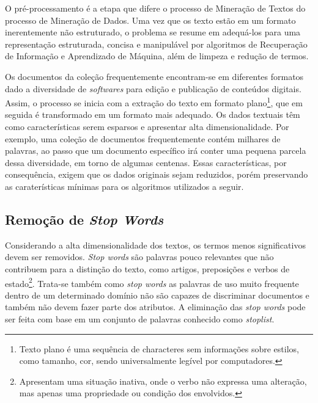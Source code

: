 


O pré-processamento é a etapa que difere o processo de Mineração de Textos do processo de Mineração de Dados. Uma vez que os texto estão em um formato inerentemente não estruturado, o problema se resume em adequá-los para uma representação estruturada, concisa e manipulável por algoritmos de Recuperação de Informação e Aprendizado de Máquina, além de limpeza e redução de termos.



Os documentos da coleção frequentemente encontram-se em diferentes formatos dado a diversidade de \textit{softwares} para edição e publicação de conteúdos digitais. Assim, o processo se inicia com a extração do texto em formato plano\footnote{Texto plano é uma sequência de characteres sem informações sobre estilos, como tamanho, cor, sendo universalmente legível por computadores.}, que em seguida é transformado em um formato mais adequado. 
%
%
% 
Os dados textuais têm como características serem esparsos e apresentar alta dimensionalidade. Por exemplo, uma coleção de documentos frequentemente contém milhares de palavras, ao passo que um documento específico irá conter uma pequena parcela dessa diversidade, em torno de algumas centenas. Essas características, por consequência, exigem que os dados originais sejam reduzidos, porém preservando as caraterísticas mínimas para os algoritmos utilizados a seguir.


\subsection*{Remoção de \textit{Stop Words}}

Considerando a alta dimensionalidade dos textos, os termos menos significativos devem ser removidos.  \textit{Stop words} são palavras pouco relevantes que não contribuem para a distinção do texto, como artigos, preposições e verbos de estado\footnote{Apresentam uma situação inativa, onde o verbo não expressa uma alteração, mas apenas uma propriedade ou condição dos envolvidos.}. Trata-se também como \textit{stop words} as palavras de uso muito frequente dentro de um determinado domínio não são capazes de discriminar documentos e também não devem fazer parte dos atributos. A eliminação das \textit{stop words} pode ser feita com base em um conjunto de palavras conhecido como \textit{stoplist}.








